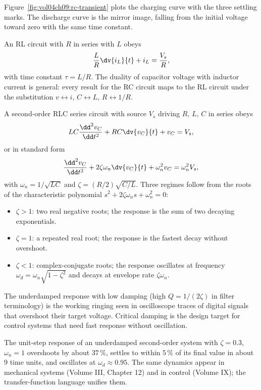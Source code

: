 

Figure~\ref{fig:vol04ch09:rc-transient} plots the charging curve with
the three settling marks. The discharge curve is the mirror image,
falling from the initial voltage toward zero with the same time
constant.

An RL circuit with $R$ in series with $L$ obeys
\[
\frac{L}{R}\dv{i_{L}}{t} + i_{L} = \frac{V_{s}}{R},
\]
with time constant $\tau = L/R$. The duality of capacitor voltage
with inductor current is general: every result for the RC circuit
maps to the RL circuit under the substitution $v \leftrightarrow i$,
$C \leftrightarrow L$, $R \leftrightarrow 1/R$.

A second-order RLC series circuit with source $V_{s}$ driving $R$,
$L$, $C$ in series obeys
\[
LC\frac{\dd^{2} v_{C}}{\dd t^{2}} + RC\dv{v_{C}}{t} + v_{C} = V_{s},
\]
or in standard form
\[
\frac{\dd^{2} v_{C}}{\dd t^{2}} + 2\zeta\omega_{n}\dv{v_{C}}{t}
+ \omega_{n}^{2} v_{C} = \omega_{n}^{2}V_{s},
\]
with  $\omega_{n} = 1/\sqrt{LC}$ and
 $\zeta = (R/2)\sqrt{C/L}$. Three regimes
follow from the roots of the characteristic polynomial
$s^{2}+2\zeta\omega_{n}s+\omega_{n}^{2}=0$:
\begin{itemize}[leftmargin=*]
  \item {} $\zeta>1$: two real negative roots; the
    response is the sum of two decaying exponentials.
  \item {} $\zeta=1$: a repeated real root;
    the response is the fastest decay without overshoot.
  \item {} $\zeta<1$: complex-conjugate roots; the
    response oscillates at frequency $\omega_{d} = \omega_{n}\sqrt{
    1-\zeta^{2}}$ and decays at envelope rate $\zeta\omega_{n}$.
\end{itemize}
The underdamped response with low damping (high $Q = 1/(2\zeta)$ in
filter terminology) is the working ringing seen in oscilloscope traces
of digital signals that overshoot their target voltage. Critical
damping is the design target for control systems that need fast
response without oscillation.

The unit-step response of an underdamped second-order system with
$\zeta=0.3$, $\omega_{n}=1$ overshoots by about $37\,\%$, settles to
within $5\,\%$ of its final value in about $9$ time units, and
oscillates at $\omega_{d}\approx 0.95$. The same dynamics appear in
mechanical systems (Volume III, Chapter 12) and in control (Volume
IX); the transfer-function language unifies them.

